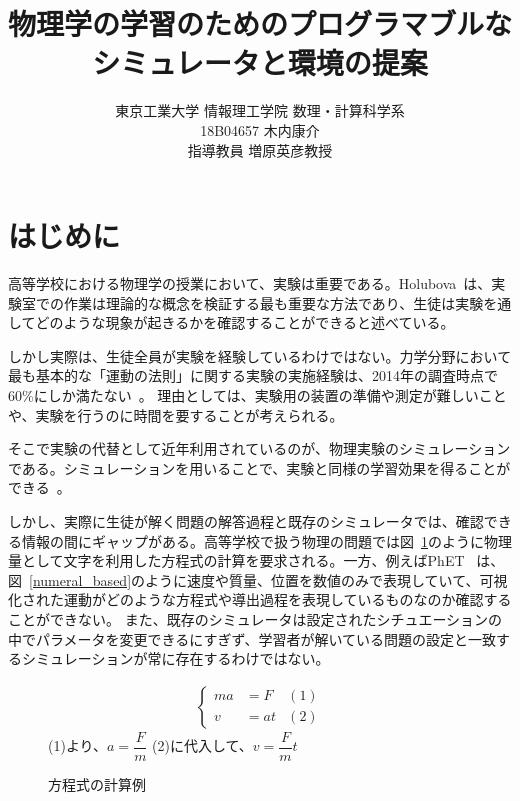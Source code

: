 \documentclass[11pt, a4paper, oneside, twocolumn, dvipdfmx]{jsarticle}
\title{物理学の学習のためのプログラマブルな
\\シミュレータと環境の提案}
\author{東京工業大学 情報理工学院 数理・計算科学系\\18B04657 木内康介\\指導教員 増原英彦教授}
\date{}
\begin{document}
\maketitle

\section{はじめに} \label{intro}
高等学校における物理学の授業において、実験は重要である。Holubova~\cite{holubova_2019}は、実験室での作業は理論的な概念を検証する最も重要な方法であり、生徒は実験を通してどのような現象が起きるかを確認することができると述べている。%

しかし実際は、生徒全員が実験を経験しているわけではない。力学分野において最も基本的な「運動の法則」に関する実験の実施経験は、2014年の調査時点で60\%にしか満たない~\cite{2015KJ00010038066}。
理由としては、実験用の装置の準備や測定が難しいことや、実験を行うのに時間を要することが考えられる。

そこで実験の代替として近年利用されているのが、物理実験のシミュレーションである。シミュレーションを用いることで、実験と同様の学習効果を得ることができる~\cite{ajredini_real_2014}。

しかし、実際に生徒が解く問題の解答過程と既存のシミュレータでは、確認できる情報の間にギャップがある。高等学校で扱う物理の問題では図~\ref{symbol_based}のように物理量として文字を利用した方程式の計算を要求される。一方、例えばPhET~\cite{perkins_phet_2006} は、図~\ref{numeral_based}のように速度や質量、位置を数値のみで表現していて、可視化された運動がどのような方程式や導出過程を表現しているものなのか確認することができない。
また、既存のシミュレータは設定されたシチュエーションの中でパラメータを変更できるにすぎず、学習者が解いている問題の設定と一致するシミュレーションが常に存在するわけではない。

\begin{figure}[b]
\begin{align}
  \left\{
  \begin{aligned}
    ma &= F & (1)\\
    v &= at & (2)
  \end{aligned}
  \right. \nonumber
\end{align}
(1)より、$a = \dfrac{F}{m}$ \quad (2)に代入して、$v = \dfrac{F}{m}t$
\centering
\caption{方程式の計算例} \label{symbol_based}
\end{figure}
\end{document}
